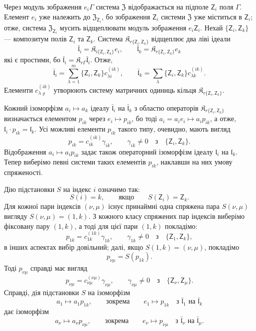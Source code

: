\documentclass[11pt]{article}
\begin{document}
Через модуль зображення \(e_i\Gamma\) система \(\mathfrak Z\) відображається на підполе \(\mathsf{Z}_i\) поля \(\Gamma\). Елемент \(e_i\) уже належить до \(\mathfrak Z_{\mathsf{Z}_i}\), бо зображення \(\mathsf{Z}_i\) системи \(\mathfrak Z\) уже міститься в \(\mathsf{Z}_i\); отже, система \(\mathfrak Z_{\mathsf{Z}_i}\) мусить відщеплювати модуль зображення \(e_i\mathsf{Z}_i\). Нехай \(\{\mathsf{Z}_i,\mathsf{Z}_k\}\) --- композитум полів \(\mathsf{Z}_i\) та \(\mathsf{Z}_k\). Система \(\mathfrak K_{r\{\mathsf{Z}_i,\mathsf{Z}_k\}}\) відщеплює два ліві ідеали
\[
\bar{\mathfrak l}_i=\mathfrak K_{i\{\mathsf{Z}_i,\mathsf{Z}_k\}}e_i,\qquad
\bar{\mathfrak l}_k=\mathfrak K_{r\{\mathsf{Z}_i,\mathsf{Z}_k\}}e_k
\]
які є простими, бо \(\bar{\mathfrak l}_i=\mathfrak K_{r\Gamma}\bar{\mathfrak l}_i\). Отже,
\[
\bar{\mathfrak l}_i=\sum_{\lambda=1}^m\{\mathsf{Z}_i,\mathsf{Z}_k\}c_{\lambda i}^{(ik)},\qquad
\bar{\mathfrak l}_k=\sum_{\lambda}\{\mathsf{Z}_i,\mathsf{Z}_k\}c_{\lambda k}^{(ik)}.
\]
Елементи \(c_{\lambda\varrho}^{(ik)}\) утворюють систему матричних одиниць кільця \(\mathfrak K_{r\{\mathsf{Z}_i,\mathsf{Z}_k\}}\).

Кожний ізоморфізм \(a_i\mapsto a_k\) ідеалу \(\bar{\mathfrak l}_i\) на \(\bar{\mathfrak l}_k\) з областю операторів \(\mathfrak K_{r\{\mathsf{Z}_i,\mathsf{Z}_k\}}\) визначається елементом \(p_{ik}\) через \(e_i\mapsto p_{ik}\), бо тоді \(a_i=a_ie_i\mapsto a_ip_{ik}\), а отже, \(\mathfrak l_i\cdot p_{ik}=\mathfrak l_k\). Усі можливі елементи \(p_{ik}\) такого типу, очевидно, мають вигляд
\[
p_{ik}=c_{ik}^{(ik)}\gamma_{ik},\qquad \gamma_{ik}\ne0\quad\text{з}\quad \{\mathsf{Z}_i,\mathsf{Z}_k\}.
\]
Відображення \(a_i\mapsto a_ip_{ik}\) задає також операторний ізоморфізм ідеалу \(\mathfrak l_i\) на \(\mathfrak l_k\). Тепер виберімо певні системи таких елементів \(p_{ik}\), наклавши на них умову спряженості.

Дію підстановки \(S\) на індекс \(i\) означимо так:
\[
S(i)=k,\qquad\text{якщо}\qquad S(\mathsf{Z}_i)=\mathsf{Z}_k.
\]
Для кожної пари індексів \((\nu,\mu)\) існує принаймні одна спряжена пара \(S(\nu,\mu)\) вигляду \(S(\nu,\mu)=(1,k)\). З кожного класу спряжених пар індексів виберімо фіксовану пару \((1,k)\), а тоді для цієї пари \((1,k)\) покладімо:
\[
p_{1k}=c_{1k}^{(1k)}\gamma_{1k},\qquad \gamma_{1k}\ne0\quad\text{з}\quad \{\mathsf{Z}_1,\mathsf{Z}_k\},
\]
в інших аспектах вибір довільний; далі, якщо \(S(1,k)=(\nu,\mu)\), покладімо
\[
p_{\nu\mu}=S(p_{1k}).
\]
Тоді \(p_{\nu\mu}\) справді має вигляд
\[
p_{\nu\mu}=c_{\nu\mu}^{(\nu\mu)}\gamma_{\nu\mu},\qquad
\gamma_{\nu\mu}\ne0\quad\text{з}\quad \{\mathsf{Z}_\nu,\mathsf{Z}_\mu\}.
\]
Справді, дія підстановки \(S\) на ізоморфізм
\[
a_1\mapsto a_1p_{1k},\qquad\text{зокрема}\qquad e_1\mapsto p_{1k}
\quad\text{з }\bar{\mathfrak l}_1\text{ на }\bar{\mathfrak l}_k
\]
дає ізоморфізм
\[
a_\nu\mapsto a_\nu p_{\nu\mu},\qquad\text{зокрема}\qquad e_\nu\mapsto p_{\nu\mu}
\quad\text{з }\bar{\mathfrak l}_\nu\text{ на }\bar{\mathfrak l}_\mu.
\]
\end{document}
